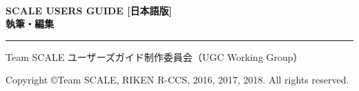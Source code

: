 \newpage
\thispagestyle{empty}

　\\

\vspace{10mm}
{\large{\bf SCALE USERS GUIDE [日本語版]}}\\


\vspace{10mm}
{\large{\bf 執筆・編集}}\\
\hrule width 90mm
\begin{tabbing}
Team SCALE ユーザーズガイド制作委員会（UGC Working Group）%
\end{tabbing}


\vspace{110mm}
\begin{flushright}

\vspace{10mm}
Copyright \copyright Team SCALE, RIKEN R-CCS, 2016, 2017, 2018. All rights reserved.
\end{flushright}

